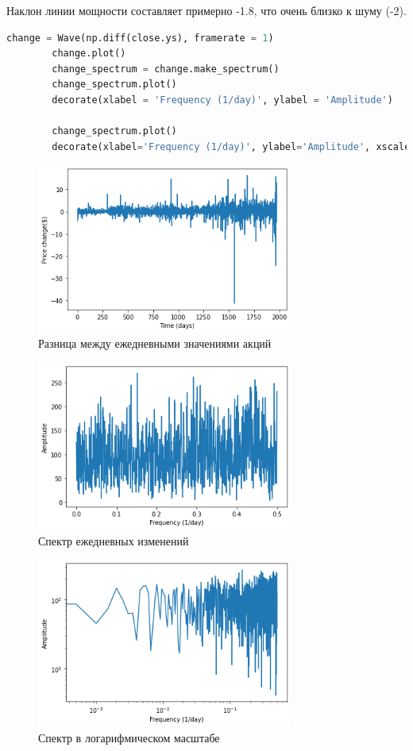 \documentclass[a4paper, 12pt]{report}
\begin{document}
	Наклон линии мощности составляет примерно -1.8, что очень близко к  шуму (-2).
	\begin{lstlisting}[language=Python,caption=Считаем разницу между последовательными элементами]
		change = Wave(np.diff(close.ys), framerate = 1)
		change.plot()
		change_spectrum = change.make_spectrum()
		change_spectrum.plot()
		decorate(xlabel = 'Frequency (1/day)', ylabel = 'Amplitude')

		change_spectrum.plot()
		decorate(xlabel='Frequency (1/day)', ylabel='Amplitude', xscale='log', yscale='log')
	\end{lstlisting}
	\begin{figure}[H]
		\centering
		\includegraphics[width=0.75\textwidth]{fac3.png}
		\caption{Разница между ежедневными значениями акций}
		\label{fig:fac3}
	\end{figure}
	\begin{figure}[H]
		\centering
		\includegraphics[width=0.75\textwidth]{fac4.png}
		\caption{Спектр ежедневных изменений}
		\label{fig:fac4}
	\end{figure}
	\begin{figure}[H]
		\centering
		\includegraphics[width=0.75\textwidth]{fac5.png}
		\caption{Спектр в логарифмическом масштабе}
		\label{fig:fac5}
	\end{figure}
\end{document}
